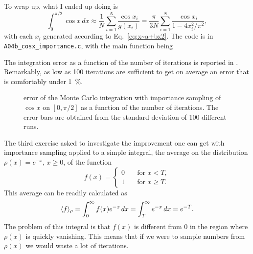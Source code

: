 \documentclass{gulartcl}
\begin{document}
To wrap up, what I ended up doing is
\begin{equation}
    \int_{0}^{\pi/2} \cos x \, dx \approx \frac{1}{N} \sum_{i = 1}^{N}
    \frac{\cos x_{i}}{g(x_{i})} = \frac{\pi}{3N} \sum_{i = 1}^{N} \frac{\cos
    x_{i}}{1 - 4 x_{i}^{2} / \pi^{2}},
\end{equation}
with each $x_i$ generated according to Eq.~\eqref{eq:x~a+bx2}. The code is in
\texttt{A04b\_cosx\_importance.c}, with the main function being

The integration error as a function of the number of iterations is reported in
. Remarkably, as low as \num{100} iterations are sufficient to
get on average an error that is comfortably under \qty{1}{\percent}.

\begin{figure}
    \centering
    
    \caption{error of the Monte Carlo integration with importance sampling of
        $\cos x$ on $[0, \pi/2]$ as a function of the number of iterations. The
        error bars are obtained from the standard deviation of \num{100}
        different runs.}
    \label{fig:A04b}
\end{figure}

The third exercise asked to investigate the improvement one can get with
importance sampling applied to a simple integral, the average on the
distribution $\rho(x) = e^{-x}$, $x \geq 0$, of the function
\begin{equation}
    f(x) =
    \begin{cases}
        0 &\quad \text{for } x < T, \\
        1 &\quad \text{for } x \geq T.
    \end{cases}
\end{equation}
This average can be readily calculated as
\begin{equation}
    \langle f\rangle_{\rho} = \int_{0}^{\infty} f(x) e^{-x} \, dx = \int_{T}^{\infty}
    e^{-x}\, dx = e^{-T}.
\end{equation}
The problem of this integral is that $f(x)$ is different from $0$ in the region
where $\rho(x)$ is quickly vanishing. This means that if we were to sample
numbers from $\rho(x)$ we would waste a lot of iterations.
\end{document}
